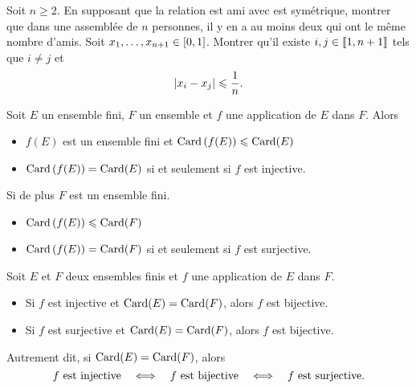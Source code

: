 \documentclass{magnolia}
\begin{document}
\begin{exos}
\exo Soit $n \geq 2$. En supposant que la relation \og est ami avec \fg est
  symétrique, montrer que dans une assemblée de $n$ personnes, il y en a au moins deux qui
  ont le même nombre d'amis.
\exo Soit $x_1,\ldots,x_{n+1}\in\left[0,1\right]$. Montrer qu'il existe
  $i,j\in\left\llbracket 1,n+1\right\rrbracket$ tels que $i\neq j$ et
  \[\left|x_i-x_j\right|\leqslant\frac{1}{n}.\]
%

\end{exos}

\begin{proposition}
Soit $E$ un ensemble fini, $F$ un ensemble et $f$ une application de $E$ dans
$F$. Alors
\begin{itemize}
\item $f(E)$ est un ensemble fini et $\operatorname{Card}\left(f(E)\right) \leqslant \operatorname{Card}(E)$
\item $\operatorname{Card}\left(f(E)\right)=\operatorname{Card}(E)$ si et seulement si $f$ est injective.
\end{itemize}
Si de plus $F$ est un ensemble fini.
\begin{itemize}
\item $\operatorname{Card}\left(f(E)\right)\leqslant\operatorname{Card}(F)$
\item $\operatorname{Card}\left(f(E)\right)=\operatorname{Card}(F)$ si et seulement si $f$ est surjective.
\end{itemize}
\end{proposition}





\begin{proposition}
Soit $E$ et $F$ deux ensembles finis et $f$ une application de $E$ dans $F$.
\begin{itemize}
\item Si $f$ est injective et $\operatorname{Card}(E)=\operatorname{Card}(F)$, alors $f$ est bijective.
\item Si $f$ est surjective et $\operatorname{Card}(E)=\operatorname{Card}(F)$, alors $f$ est bijective.
\end{itemize}
Autrement dit, si $\operatorname{Card}(E)=\operatorname{Card}(F)$, alors
\[\text{$f$ est injective} \quad\Longleftrightarrow\quad \text{$f$ est bijective} \quad\Longleftrightarrow\quad
  \text{$f$ est surjective}.\]
\end{proposition}
\end{document}

